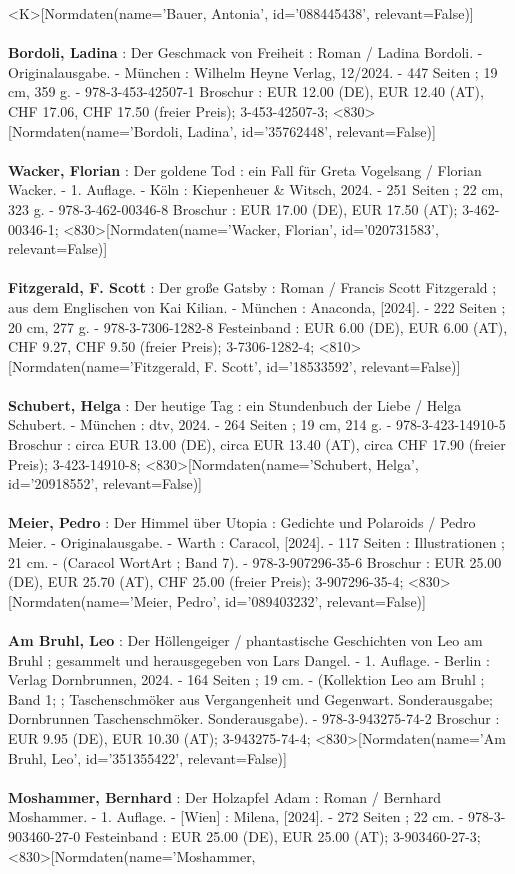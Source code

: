\documentclass{article}
\begin{document}
\begin{multicols}{3}
<K>[Normdaten(name='Bauer, Antonia', id='088445438', relevant=False)]\\\\\textbf{Bordoli, Ladina} : Der Geschmack von Freiheit : Roman / Ladina Bordoli. - Originalausgabe. - München : Wilhelm Heyne Verlag, 12/2024. - 447 Seiten ; 19 cm, 359 g. - 978-3-453-42507-1 Broschur : EUR 12.00 (DE), EUR 12.40 (AT), CHF 17.06, CHF 17.50 (freier Preis); 3-453-42507-3; <830>[Normdaten(name='Bordoli, Ladina', id='35762448', relevant=False)]\\\\\textbf{Wacker, Florian} : Der goldene Tod : ein Fall für Greta Vogelsang / Florian Wacker. - 1. Auflage. - Köln : Kiepenheuer \& Witsch, 2024. - 251 Seiten ; 22 cm, 323 g. - 978-3-462-00346-8 Broschur : EUR 17.00 (DE), EUR 17.50 (AT); 3-462-00346-1; <830>[Normdaten(name='Wacker, Florian', id='020731583', relevant=False)]\\\\\textbf{Fitzgerald, F. Scott} : Der große Gatsby : Roman / Francis Scott Fitzgerald ; aus dem Englischen von Kai Kilian. - München : Anaconda, [2024]. - 222 Seiten ; 20 cm, 277 g. - 978-3-7306-1282-8 Festeinband : EUR 6.00 (DE), EUR 6.00 (AT), CHF 9.27, CHF 9.50 (freier Preis); 3-7306-1282-4; <810>[Normdaten(name='Fitzgerald, F. Scott', id='18533592', relevant=False)]\\\\\textbf{Schubert, Helga} : Der heutige Tag : ein Stundenbuch der Liebe / Helga Schubert. - München : dtv, 2024. - 264 Seiten ; 19 cm, 214 g. - 978-3-423-14910-5 Broschur : circa EUR 13.00 (DE), circa EUR 13.40 (AT), circa CHF 17.90 (freier Preis); 3-423-14910-8; <830>[Normdaten(name='Schubert, Helga', id='20918552', relevant=False)]\\\\\textbf{Meier, Pedro} : Der Himmel über Utopia : Gedichte und Polaroids / Pedro Meier. - Originalausgabe. - Warth : Caracol, [2024]. - 117 Seiten : Illustrationen ; 21 cm. - (Caracol WortArt ; Band 7). - 978-3-907296-35-6 Broschur : EUR 25.00 (DE), EUR 25.70 (AT), CHF 25.00 (freier Preis); 3-907296-35-4; <830>[Normdaten(name='Meier, Pedro', id='089403232', relevant=False)]\\\\\textbf{Am Bruhl, Leo} : Der Höllengeiger / phantastische Geschichten von Leo am Bruhl ; gesammelt und herausgegeben von Lars Dangel. - 1. Auflage. - Berlin : Verlag Dornbrunnen, 2024. - 164 Seiten ; 19 cm. - (Kollektion Leo am Bruhl ; Band 1; ; Taschenschmöker aus Vergangenheit und Gegenwart. Sonderausgabe; Dornbrunnen Taschenschmöker. Sonderausgabe). - 978-3-943275-74-2 Broschur : EUR 9.95 (DE), EUR 10.30 (AT); 3-943275-74-4; <830>[Normdaten(name='Am Bruhl, Leo', id='351355422', relevant=False)]\\\\\textbf{Moshammer, Bernhard} : Der Holzapfel Adam : Roman / Bernhard Moshammer. - 1. Auflage. - [Wien] : Milena, [2024]. - 272 Seiten ; 22 cm. - 978-3-903460-27-0 Festeinband : EUR 25.00 (DE), EUR 25.00 (AT); 3-903460-27-3; <830>[Normdaten(name='Moshammer, 
\end{multicols}
\end{document}
